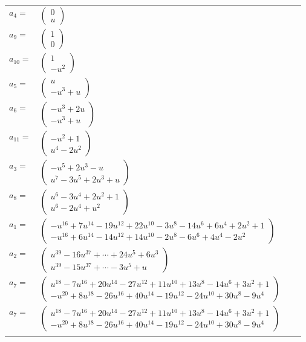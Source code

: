 \documentclass[1p]{elsarticle_modified}
\theoremstyle{definition}
\begin{document}
\begin{tabular}{m{7pt} m{180pt} m{7pt} m{180pt} }
\flushright $a_{4}=$&$\begin{pmatrix}0\\u\end{pmatrix}$ \\
\flushright $a_{9}=$&$\begin{pmatrix}1\\0\end{pmatrix}$ \\
\flushright $a_{10}=$&$\begin{pmatrix}1\\- u^2\end{pmatrix}$ \\
\flushright $a_{5}=$&$\begin{pmatrix}u\\- u^3+u\end{pmatrix}$ \\
\flushright $a_{6}=$&$\begin{pmatrix}- u^3+2 u\\- u^3+u\end{pmatrix}$ \\
\flushright $a_{11}=$&$\begin{pmatrix}- u^2+1\\u^4-2 u^2\end{pmatrix}$ \\
\flushright $a_{3}=$&$\begin{pmatrix}- u^5+2 u^3- u\\u^7-3 u^5+2 u^3+u\end{pmatrix}$ \\
\flushright $a_{8}=$&$\begin{pmatrix}u^6-3 u^4+2 u^2+1\\u^6-2 u^4+u^2\end{pmatrix}$ \\
\flushright $a_{1}=$&$\begin{pmatrix}- u^{16}+7 u^{14}-19 u^{12}+22 u^{10}-3 u^8-14 u^6+6 u^4+2 u^2+1\\- u^{16}+6 u^{14}-14 u^{12}+14 u^{10}-2 u^8-6 u^6+4 u^4-2 u^2\end{pmatrix}$ \\
\flushright $a_{2}=$&$\begin{pmatrix}u^{39}-16 u^{37}+\cdots+24 u^5+6 u^3\\u^{39}-15 u^{37}+\cdots-3 u^5+u\end{pmatrix}$ \\
\flushright $a_{7}=$&$\begin{pmatrix}u^{18}-7 u^{16}+20 u^{14}-27 u^{12}+11 u^{10}+13 u^8-14 u^6+3 u^2+1\\- u^{20}+8 u^{18}-26 u^{16}+40 u^{14}-19 u^{12}-24 u^{10}+30 u^8-9 u^4\end{pmatrix}$\\ \flushright $a_{7}=$&$\begin{pmatrix}u^{18}-7 u^{16}+20 u^{14}-27 u^{12}+11 u^{10}+13 u^8-14 u^6+3 u^2+1\\- u^{20}+8 u^{18}-26 u^{16}+40 u^{14}-19 u^{12}-24 u^{10}+30 u^8-9 u^4\end{pmatrix}$\\&\end{tabular}
\end{document}
